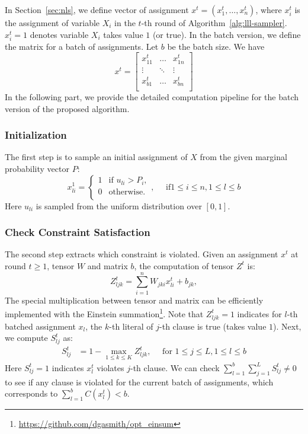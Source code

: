     {In Section~\ref{sec:nls}, we define  vector of assignment  $x^t=(x^t_1, \dots, x^t_n)$,
        where $x_i^t$ is the assignment of variable $X_i$ in the $t$-th round of Algorithm~\ref{alg:lll-sampler}. $x^t_i=1$ denotes  variable $X_i$ takes value $1$ (or true). In the batch version, we define the matrix for a batch  of assignments. Let $b$ be the batch size. We have}
\begin{equation*}
    x^{t}=\begin{bmatrix}
        x^t_{11} & \dots  & x^t_{1n} \\
        \vdots   & \ddots & \vdots   \\
        x^t_{b1} & \dots  & x^t_{bn} \\
    \end{bmatrix}
\end{equation*}
{In the following part, we provide the detailed computation pipeline for the batch version of the proposed algorithm.}

\subsubsection*{Initialization} {The first step is to sample an initial assignment of $X$ from the given marginal probability vector $P$:}
\begin{equation}
    x^1_{li} = \begin{cases}
        1 & \text{if } u_{li}> P_i, \\
        0 & \text{otherwise}.       \\
    \end{cases},\quad \text{ if} 1\le i\le n, 1\le l\le b
\end{equation}
{Here $u_{li}$ is sampled from the uniform distribution over $[0,1]$.}

\subsubsection*{Check Constraint Satisfaction} { The second step extracts which constraint is violated. Given an assignment $x^t$ at round $t\ge 1$, tensor $W$ and matrix $b$, the computation of tensor $Z^t$ is:}
\begin{equation*}
    Z^t_{ljk} =\sum_{i=1}^n W_{jki} x_{li}^t+b_{jk},
\end{equation*}
{The special  multiplication between tensor and matrix can be efficiently implemented with the  Einstein summation\footnote{\url{https://github.com/dgasmith/opt_einsum}}.
%
Note that $Z^t_{ljk}=1$ indicates for $l$-th batched assignment $x_l$, the
$k$-th literal of $j$-th clause is true (takes value $1$). Next, we compute
$S^t_{lj}$ as:}
\begin{align*}
    S^t_{lj} & =1-\max_{1\le k\le K} Z^t_{ljk}, \quad \text{ for } 1\le j\le L, 1\le l\le b
\end{align*}
{Here $S^t_{lj}=1$ indicates $x_l^t$ violates $j$-th clause.
%
We can check $\sum_{l=1}^b\sum_{j=1}^LS^t_{lj}\neq 0$ to see if any clause is
violated for the current batch of assignments, which corresponds to
$\sum_{l=1}^b C(x_l^t)<b$. }

